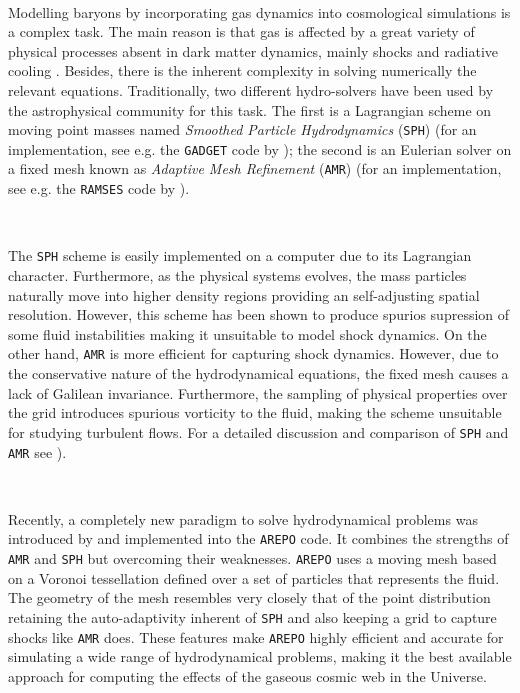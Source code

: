 \documentclass[a4,useAMS,usenatbib,usegraphicx,12pt]{article}
\begin{document}
\

Modelling baryons by incorporating gas dynamics into cosmological
simulations is a complex task. The main reason is that gas is
affected by a great variety of physical processes absent in dark
matter dynamics, mainly shocks and radiative cooling
\citep{Bond93}. Besides, there is the inherent complexity in
solving numerically the relevant equations. Traditionally, two
different hydro-solvers have been used by the astrophysical community
for this task. The first is a Lagrangian scheme on moving point masses
named \textit{Smoothed Particle Hydrodynamics} (\texttt{SPH}) 
\citep{Monaghan92} (for an implementation, see e.g. the \texttt{GADGET} 
code by \citet{Springel05}); the second is an Eulerian solver on a fixed 
mesh known as \textit{ Adaptive Mesh Refinement} (\texttt{AMR})
\citep{Berger89} (for an implementation,  see e.g. the \texttt{RAMSES}
code by \citet{Teyssier02}).  

\

The \texttt{SPH} scheme is easily implemented on a computer due to its 
Lagrangian character. Furthermore, as the physical systems evolves, the
mass particles naturally move into higher density regions providing an
self-adjusting spatial resolution. However, this scheme has been shown
to produce spurios supression of some fluid instabilities making it
unsuitable to model shock dynamics. 
On the other hand, \texttt{AMR} is more efficient 
for capturing shock dynamics. However, due to the conservative nature of the
hydrodynamical equations, the fixed mesh causes a lack of Galilean
invariance. Furthermore, the sampling of physical properties over the
grid introduces spurious vorticity to the fluid, making the scheme
unsuitable for studying turbulent flows. For a detailed  discussion
and comparison of \texttt{SPH} and \texttt{AMR} see \citet{Plewa01}).

\

Recently, a completely new paradigm to solve hydrodynamical problems was 
introduced by \citet{Springel10} and  implemented into the \texttt{AREPO}
code. It combines the strengths of  \texttt{AMR} and \texttt{SPH} but
overcoming their weaknesses. \texttt{AREPO} uses a moving mesh based
on a Voronoi tessellation defined over a set of particles that represents 
the fluid. The geometry of the mesh resembles very closely that 
of the point distribution retaining the auto-adaptivity inherent of
\texttt{SPH} and also keeping a grid to capture shocks like
\texttt{AMR} does. These features make \texttt{AREPO} highly 
efficient and accurate for simulating a wide range of hydrodynamical
problems, making it the best available approach for computing the
effects of the gaseous cosmic web in the Universe.
\end{document}
